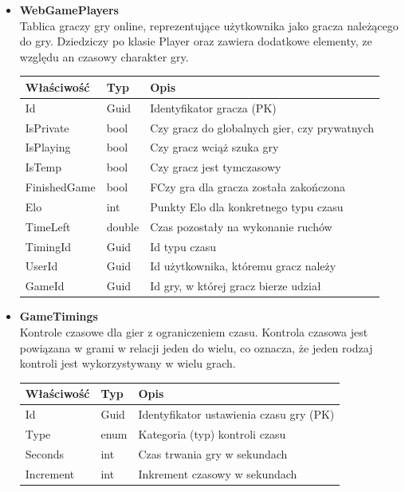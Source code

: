 \documentclass[twoside]{projektInzynierskiMS1}
\begin{document}
\begin{itemize}
    \item \textbf{WebGamePlayers}\\
    Tablica graczy gry online, reprezentujące użytkownika jako gracza należącego do gry. Dziedziczy po klasie Player oraz zawiera dodatkowe elementy, ze względu an czasowy charakter gry.
    \renewcommand{\arraystretch}{1.2}
    \begin{longtable}{|m{4cm}|m{2cm}|m{8cm}|}
        \hline
        \rowcolor{lightgray}
        \textbf{Właściwość} & \textbf{Typ} & \textbf{Opis} \\ \hline
        \endhead
        \hline
        Id & Guid & Identyfikator gracza (PK) \\ \hline
        IsPrivate & bool & Czy gracz do globalnych gier, czy prywatnych \\ \hline
        IsPlaying & bool & Czy gracz wciąż szuka gry \\ \hline
        IsTemp & bool & Czy gracz jest tymczasowy \\ \hline
        FinishedGame & bool & FCzy gra dla gracza została zakończona \\ \hline
        Elo & int & Punkty Elo dla konkretnego typu czasu \\ \hline
        TimeLeft & double & Czas pozostały na wykonanie ruchów \\ \hline
        TimingId & Guid & Id typu czasu \\ \hline
        UserId & Guid & Id użytkownika, któremu gracz należy \\ \hline
        GameId & Guid & Id gry, w której gracz bierze udział \\ \hline
    \end{longtable}
 
\newpage

    \item \textbf{GameTimings}\\
    Kontrole czasowe dla gier z ograniczeniem czasu. Kontrola czasowa jest powiązana w grami w relacji jeden do wielu, co oznacza, że jeden rodzaj kontroli jest wykorzystywany w wielu grach.
    \renewcommand{\arraystretch}{1.2}
    \begin{longtable}{|m{4cm}|m{2cm}|m{8cm}|}
        \hline
        \rowcolor{lightgray}
        \textbf{Właściwość} & \textbf{Typ} & \textbf{Opis} \\ \hline
        \endhead
        \hline
        Id & Guid & Identyfikator ustawienia czasu gry (PK) \\ \hline
        Type & enum & Kategoria (typ) kontroli czasu \\ \hline
        Seconds & int & Czas trwania gry w sekundach \\ \hline
        Increment & int & Inkrement czasowy w sekundach \\ \hline
    \end{longtable}


\end{itemize}
\end{document}
